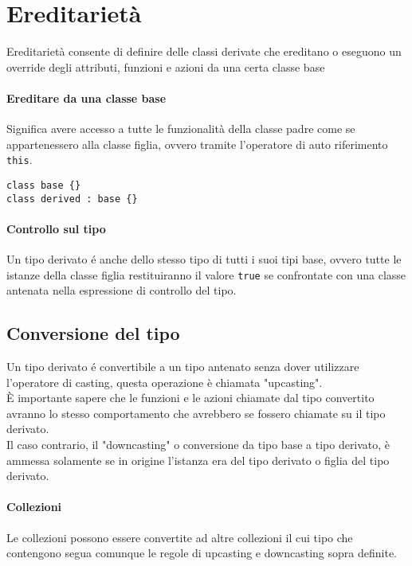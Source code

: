 \section{Ereditarietà}
Ereditarietà consente di definire delle classi derivate che ereditano o eseguono un override degli attributi, funzioni e azioni 
da una certa classe base
\paragraph{Ereditare da una classe base} 
Significa avere accesso a tutte le funzionalità della classe padre come se appartenessero alla classe figlia,
ovvero tramite l'operatore di auto riferimento \lstinline|this|.
\begin{lstlisting}
class base {}
class derived : base {}
\end{lstlisting}
\paragraph{Controllo sul tipo}
Un tipo derivato é anche dello stesso tipo di tutti i suoi tipi base, ovvero tutte le istanze
della classe figlia restituiranno il valore \lstinline|true| se confrontate con una classe 
antenata nella espressione di controllo del tipo. 

\subsection{Conversione del tipo}
Un tipo derivato é convertibile a un tipo antenato senza dover utilizzare l'operatore di casting,
questa operazione è chiamata "upcasting". \\
È importante sapere che le funzioni e le azioni chiamate dal tipo convertito avranno 
lo stesso comportamento che avrebbero se fossero chiamate su il tipo derivato. \\
Il caso contrario, il "downcasting" o conversione da tipo base a tipo derivato, è ammessa solamente
se in origine l'istanza era del tipo derivato o figlia del tipo derivato. 

\paragraph{Collezioni}
Le collezioni possono essere convertite ad altre collezioni il cui tipo che contengono segua 
comunque le regole di upcasting e downcasting sopra definite. 

